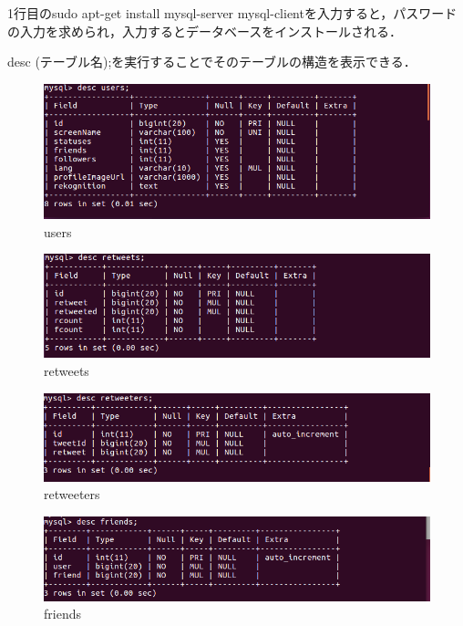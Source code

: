 1行目のsudo apt-get install mysql-server mysql-clientを入力すると，パスワードの入力を求められ，入力するとデータベースをインストールされる．

\clearpage
desc (テーブル名);を実行することでそのテーブルの構造を表示できる．
\begin{figure}[htb]
\centering
\includegraphics[width=13cm]{users.png}
\caption{users}\label{users}
\end{figure}

\begin{figure}[htb]
\centering
\includegraphics[width=13cm]{retweets.png}
\caption{retweets}\label{retweets}
\end{figure}
\newpage
\begin{figure}[htb]
\centering
\includegraphics[width=13cm]{retweeters.png}
\caption{retweeters}\label{retweeters}
\end{figure}

\begin{figure}[htb]
\centering
\includegraphics[width=13cm]{friends.png}
\caption{friends}\label{friends}
\end{figure}


